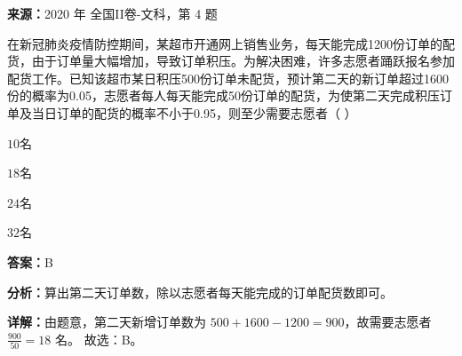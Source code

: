 \begin{question}[points=5]
\textbf{来源：}2020 年 全国II卷-文科，第 4 题\par
在新冠肺炎疫情防控期间，某超市开通网上销售业务，每天能完成1200份订单的配货，由于订单量大幅增加，导致订单积压。为解决困难，许多志愿者踊跃报名参加配货工作。已知该超市某日积压500份订单未配货，预计第二天的新订单超过1600份的概率为0.05，志愿者每人每天能完成50份订单的配货，为使第二天完成积压订单及当日订单的配货的概率不小于0.95，则至少需要志愿者（ ）
\begin{choices}
  \item $10$名
  \item $18$名
  \item $24$名
  \item $32$名
\end{choices}
\begin{solution}
\textbf{答案：}B

\textbf{分析：}算出第二天订单数，除以志愿者每天能完成的订单配货数即可。

\textbf{详解：}由题意，第二天新增订单数为 $500+1600-1200=900$，故需要志愿者 $\frac{900}{50}=18$ 名。
故选：B。
\end{solution}
\end{question}

